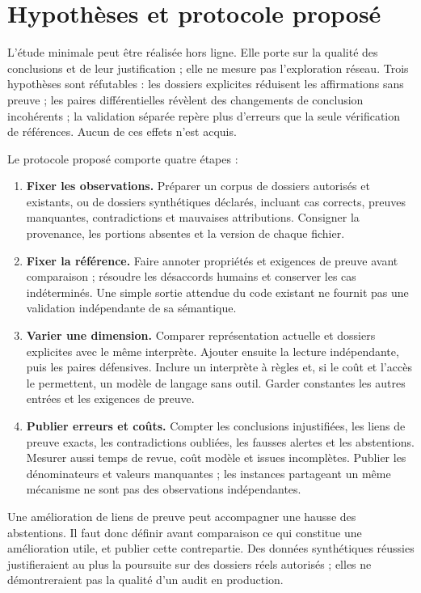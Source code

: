 \documentclass[11pt,a4paper]{article}
\begin{document}
\section{Hypothèses et protocole proposé}
L'étude minimale peut être réalisée hors ligne. Elle porte sur la qualité des
conclusions et de leur justification ; elle ne mesure pas l'exploration réseau.
Trois hypothèses sont réfutables : les dossiers explicites réduisent les
affirmations sans preuve ; les paires différentielles révèlent des changements
de conclusion incohérents ; la validation séparée repère plus d'erreurs que la
seule vérification de références. Aucun de ces effets n'est acquis.

Le protocole proposé comporte quatre étapes :
\begin{enumerate}
\item \textbf{Fixer les observations.} Préparer un corpus de dossiers autorisés
et existants, ou de dossiers synthétiques déclarés, incluant cas corrects,
preuves manquantes, contradictions et mauvaises attributions. Consigner la
provenance, les portions absentes et la version de chaque fichier.
\item \textbf{Fixer la référence.} Faire annoter propriétés et exigences de
preuve avant comparaison ; résoudre les désaccords humains et conserver les
cas indéterminés. Une simple sortie attendue du code existant ne fournit pas
une validation indépendante de sa sémantique.
\item \textbf{Varier une dimension.} Comparer représentation actuelle et dossiers
explicites avec le même interprète. Ajouter ensuite la lecture indépendante,
puis les paires défensives. Inclure un interprète à règles et, si le coût et
l'accès le permettent, un modèle de langage sans outil. Garder constantes les
autres entrées et les exigences de preuve.
\item \textbf{Publier erreurs et coûts.} Compter les conclusions injustifiées,
les liens de preuve exacts, les contradictions oubliées, les fausses alertes
et les abstentions. Mesurer aussi temps de revue, coût modèle et issues
incomplètes. Publier les dénominateurs et valeurs manquantes ; les instances
partageant un même mécanisme ne sont pas des observations indépendantes.
\end{enumerate}

Une amélioration de liens de preuve peut accompagner une hausse des abstentions.
Il faut donc définir avant comparaison ce qui constitue une amélioration utile,
et publier cette contrepartie. Des données synthétiques réussies justifieraient
au plus la poursuite sur des dossiers réels autorisés ; elles ne démontreraient
pas la qualité d'un audit en production.
\end{document}
